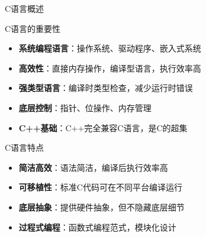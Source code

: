 \documentclass[UTF8,aspectratio=169]{beamer}
\begin{document}
\begin{frame}{C语言概述}
    \begin{ytublock}{C语言的重要性}
        \begin{itemize}
            \item \textbf{系统编程语言}：操作系统、驱动程序、嵌入式系统
            \item \textbf{高效性}：直接内存操作，编译型语言，执行效率高
            \item \textbf{强类型语言}：编译时类型检查，减少运行时错误
            \item \textbf{底层控制}：指针、位操作、内存管理
            \item \textbf{C++基础}：C++完全兼容C语言，是C的超集
        \end{itemize}
    \end{ytublock}

    \begin{ytublock}{C语言特点}
        \begin{itemize}
            \item \textbf{简洁高效}：语法简洁，编译后执行效率高
            \item \textbf{可移植性}：标准C代码可在不同平台编译运行
            \item \textbf{底层抽象}：提供硬件抽象，但不隐藏底层细节
            \item \textbf{过程式编程}：函数式编程范式，模块化设计
        \end{itemize}
    \end{ytublock}
\end{frame}
\end{document}
